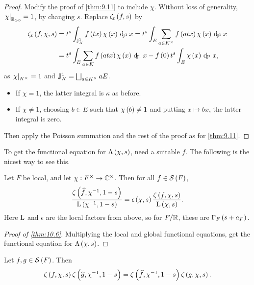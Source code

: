 \begin{proof}
Modify the proof of \ref{thm:9.11} to include $ \chi $. Without loss of generality, $ \left. \chi \right|_{\mathbb{R}_{> 0}} = 1 $, by changing $ s $. Replace $ \zeta_t\br{f, s} $ by
\begin{align*}
\zeta_t\br{f, \chi, s}
& = t^s\intJI{f\br{tx}\chi\br{x}}{x}
= t^s\intJI[E]{\sum_{a \in K^\times} f\br{atx}\chi\br{x}}{x} \\
& = t^s\intJI[E]{\sum_{a \in K} f\br{atx}\chi\br{x}}{x} - f\br{0}t^s\intJI[E]{\chi\br{x}}{x},
\end{align*}
as $ \left. \chi \right|_{K^\times} = 1 $ and $ \mathbb{J}_K^1 = \bigsqcup_{a \in K^\times} aE $.
\begin{itemize}
\item If $ \chi = 1 $, the latter integral is $ \kappa $ as before.
\item If $ \chi \ne 1 $, choosing $ b \in E $ such that $ \chi\br{b} \ne 1 $ and putting $ x \mapsto bx $, the latter integral is zero.
\end{itemize}
Then apply the Poisson summation and the rest of the proof as for \ref{thm:9.11}.
\end{proof}

To get the functional equation for $ \Lambda\br{\chi, s} $, need a suitable $ f $. The following is the nicest way to see this.

\begin{theorem}
\label{thm:10.8}
Let $ F $ be local, and let $ \chi : F^\times \to \mathbb{C}^\times $. Then for all $ f \in \SSS\br{F} $,
$$ \dfrac{\zeta\br{\widehat{f}, \chi^{-1}, 1 - s}}{\L\br{\chi^{-1}, 1 - s}} = \epsilon\br{\chi, s}\dfrac{\zeta\br{f, \chi, s}}{\L\br{\chi, s}}. $$
Here $ \mathrm{L} $ and $ \epsilon $ are the local factors from above, so for $ F / \mathbb{R} $, these are $ \Gamma_F\br{s + a_F} $.
\end{theorem}

\begin{proof}[Proof of \ref{thm:10.6}]
Multiplying the local and global functional equations, get the functional equation for $ \Lambda\br{\chi, s} $.
\end{proof}

\pagebreak

\begin{proposition}
\label{prop:10.9}
Let $ f, g \in \SSS\br{F} $. Then
$$ \zeta\br{f, \chi, s}\zeta\br{\widehat{g}, \chi^{-1}, 1 - s} = \zeta\br{\widehat{f}, \chi^{-1}, 1 - s}\zeta\br{g, \chi, s}. $$
\end{proposition}


